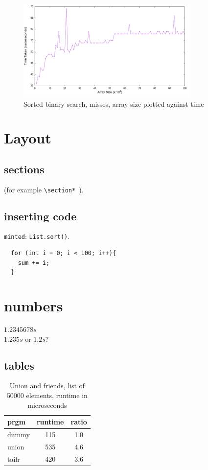 \documentclass[a4paper,11pt]{article}
\begin{document}
\begin{figure}[h!]
  \centering
  \includegraphics[width=0.8\textwidth]{sorted_search_miss_plot}
  \caption{Sorted binary search, misses, array size plotted against time}
  \label{fig:sorted_search_miss_plot}
\end{figure}

\section*{Layout}

\subsection{sections}

{\tt *} (for
example {\tt \textbackslash section* }).

\subsection*{inserting code}

{\tt minted}: {\tt List.sort()}.

\begin{verbatim}
  for (int i = 0; i < 100; i++){
    sum += i;
  }
\end{verbatim}

\section*{numbers}

$1.2345678 s$ \\
$1.235 s$ or $1.2 s$?

\subsection*{tables}

\begin{table}[h]
\begin{center}
\begin{tabular}{l|c|c}
\textbf{prgm} & \textbf{runtime} & \textbf{ratio}\\
\hline
  dummy      &  115 &     1.0\\
  union      &  535 &     4.6\\
  tailr      &  420 &     3.6\\
\end{tabular}
\caption{Union and friends, list of 50000 elements, runtime in microseconds}
\label{tab:table1}
\end{center}
\end{table}
\end{document}
